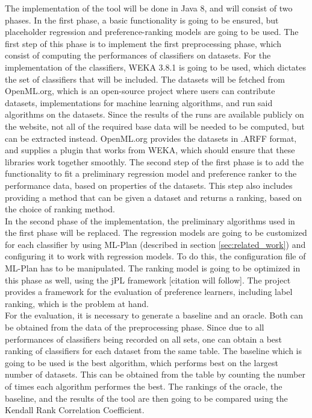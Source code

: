 \documentclass[12pt]{scrartcl}
\begin{document}
The implementation of the tool will be done in Java 8, and will consist of two phases. In the first phase, a basic functionality is going to be ensured, but placeholder regression and preference-ranking models are going to be used. The first step of this phase is to implement the first preprocessing phase, which consist of computing the performances of classifiers on datasets. For the implementation of the classifiers, WEKA 3.8.1 is going to be used, which dictates the set of classifiers that will be included. The datasets will be fetched from OpenML.org, which is an open-source project where users can contribute datasets, implementations for machine learning algorithms, and run said algorithms on the datasets. Since the results of the runs are available publicly on the website, not all of the required base data will be needed to be computed, but can be extracted instead. OpenML.org provides the datasets in .ARFF format, and supplies a plugin that works from WEKA, which should ensure that these libraries work together smoothly. The second step of the first phase is to add the functionality to fit a preliminary regression model and preference ranker to the performance data, based on properties of the datasets. This step also includes providing a method that can be given a dataset and returns a ranking, based on the choice of ranking method.\\

In the second phase of the implementation, the preliminary algorithms used in the first phase will be replaced. The regression models are going to be customized for each classifier by using ML-Plan (described in section \ref{sec:related_work}) and configuring it to work with regression models. To do this, the configuration file of ML-Plan has to be manipulated. The ranking model is going to be optimized in this phase as well, using the jPL framework [citation will follow]. The project provides a framework for the evaluation of preference learners, including label ranking, which is the problem at hand.\\

For the evaluation, it is necessary to generate a baseline and an oracle. Both can be obtained from the data of the preprocessing phase. Since due to all performances of classifiers being recorded on all sets, one can obtain a best ranking of classifiers for each dataset from the same table. The baseline which is going to be used is the best algorithm, which performs best on the largest number of datasets. This can be obtained from the table by counting the number of times each algorithm performes the best. The rankings of the oracle, the baseline, and the results of the tool are then going to be compared using the Kendall Rank Correlation Coefficient.
\end{document}
